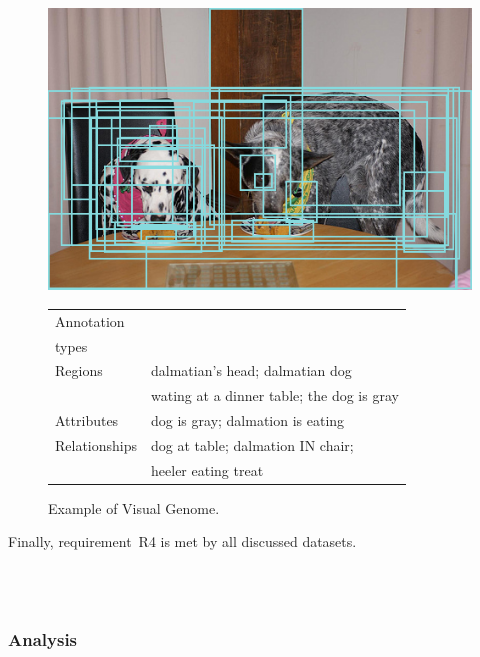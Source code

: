{\begin{figure}[t]
	\begin{center}
	\begin{minipage}{.37\textwidth}
		\includegraphics[scale=.25]{fig/visual_genome_dogs.png}
	\end{minipage}
	\begin{minipage}{.6\textwidth}
		\begin{tabular}{l|l}
			\hline
			Annotation	& \\	
			types		& 	\\
			\hline \hline
			Regions &  dalmatian's head; dalmatian dog\\
					& wating at a dinner table; the dog is gray\\
			Attributes & dog is gray; dalmation is eating\\
			Relationships & dog at table; dalmation IN chair; \\
							& heeler eating treat \\
							\hline
		\end{tabular}
	\end{minipage}
	\caption{Example of Visual Genome. \label{fig:ex_visualgenome}}
	\end{center}
\end{figure}


\noindent
Finally, requirement~R4 is met by all discussed datasets. 

\\\\
\subsubsection{Analysis}

}
